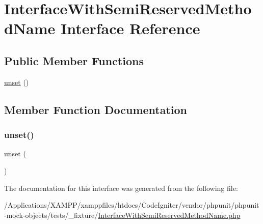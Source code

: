 \hypertarget{interface_interface_with_semi_reserved_method_name}{}\section{Interface\+With\+Semi\+Reserved\+Method\+Name Interface Reference}
\label{interface_interface_with_semi_reserved_method_name}
\subsection*{Public Member Functions}
\begin{DoxyCompactItemize}
\item 
\mbox{\hyperlink{interface_interface_with_semi_reserved_method_name_a8bb4d612156cd75b8c084c30f6d00d38}{unset}} ()
\end{DoxyCompactItemize}


\subsection{Member Function Documentation}
\mbox{\label{interface_interface_with_semi_reserved_method_name_a8bb4d612156cd75b8c084c30f6d00d38}} 
\subsubsection{\texorpdfstring{unset()}{unset()}}
{\footnotesize\ttfamily unset (\begin{DoxyParamCaption}{ }\end{DoxyParamCaption})}



The documentation for this interface was generated from the following file\+:\begin{DoxyCompactItemize}
\item 
/\+Applications/\+X\+A\+M\+P\+P/xamppfiles/htdocs/\+Code\+Igniter/vendor/phpunit/phpunit-\/mock-\/objects/tests/\+\_\+fixture/\mbox{\hyperlink{_interface_with_semi_reserved_method_name_8php}{Interface\+With\+Semi\+Reserved\+Method\+Name.\+php}}\end{DoxyCompactItemize}
